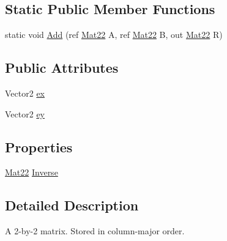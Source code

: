 \subsection*{Static Public Member Functions}
\begin{DoxyCompactItemize}
\item 
static void \hyperlink{struct_farseer_physics_1_1_common_1_1_mat22_a0ed822fe6999175b5eb62406f883a5d8}{Add} (ref \hyperlink{struct_farseer_physics_1_1_common_1_1_mat22}{Mat22} A, ref \hyperlink{struct_farseer_physics_1_1_common_1_1_mat22}{Mat22} B, out \hyperlink{struct_farseer_physics_1_1_common_1_1_mat22}{Mat22} R)
\end{DoxyCompactItemize}
\subsection*{Public Attributes}
\begin{DoxyCompactItemize}
\item 
Vector2 \hyperlink{struct_farseer_physics_1_1_common_1_1_mat22_aa015023e16afd7001baf3962dd4968a0}{ex}
\item 
Vector2 \hyperlink{struct_farseer_physics_1_1_common_1_1_mat22_a96d3ed874759e3e896b0819d668e07d0}{ey}
\end{DoxyCompactItemize}
\subsection*{Properties}
\begin{DoxyCompactItemize}
\item 
\hyperlink{struct_farseer_physics_1_1_common_1_1_mat22}{Mat22} \hyperlink{struct_farseer_physics_1_1_common_1_1_mat22_ad3c54ce6b23cc803179665459170f4df}{Inverse}
\end{DoxyCompactItemize}


\subsection{Detailed Description}
A 2-\/by-\/2 matrix. Stored in column-\/major order. 



